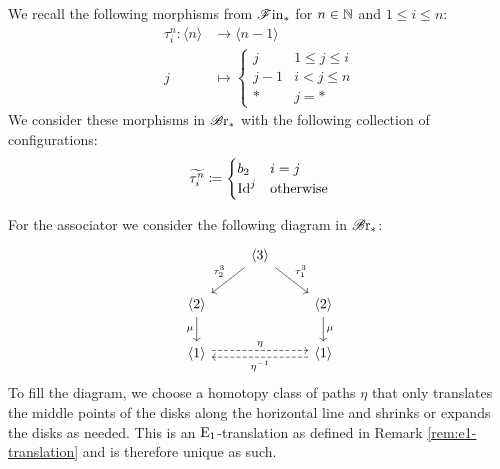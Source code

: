 \begin{const}
We recall the following morphisms from $\mathscr{F} \text{in}_{\ast}$ for $n \in \mathbb{N}$ and $1 \leq i \leq
n$:
\begin{align*}
    \tau^n_i \colon \langle n \rangle &\to \langle n-1 \rangle \\
    j &\mapsto \begin{cases}
        j &  1 \leq j \leq i \\
        j-1 & i < j \leq n \\
        \ast & j=\ast
    \end{cases}
\end{align*}
We consider these morphisms in $\mathscr{B} \text{r}_{\ast}$ with the following collection of
configurations:
\begin{align*}
    \widetilde{\tau^n_i} \coloneq
     \begin{cases}
        b_2 &   i=j \\
        \operatorname{Id}^j & \text{otherwise}
    \end{cases}
\end{align*}

For the associator we consider the following diagram in $\mathscr{B} \text{r}_{\ast}$:
    \[
        \begin{tikzcd}
                                                                    & \langle 3 \rangle \arrow[ld, "\tau^3_2"'] \arrow[rd, "\tau^3_1"] &                                                               \\
            \langle 2 \rangle \arrow[d, "\mu"']                      &                                                                  & \langle 2 \rangle \arrow[d, "\mu"]                            \\
            \langle 1 \rangle \arrow[rr, "\eta", dashed, shift left] &                                                                  & \langle 1 \rangle \arrow[ll, "\eta^{-1}", dashed, shift left]
        \end{tikzcd}
    \]
    To fill the diagram, we choose a homotopy class of paths $\eta$ that only
    translates the middle points of the disks along the horizontal line and
    shrinks or expands the disks as needed. This is an $\operatorname{E}_1$-translation as
    defined in Remark \ref{rem:e1-translation} and is therefore unique as such.
    \begin{center}
\end{center}
\end{const}
